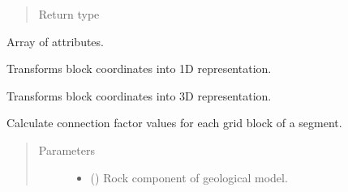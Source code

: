 \documentclass[letterpaper,10pt,english]{sphinxmanual}
\begin{document}
\begin{fulllineitems}
\begin{fulllineitems}
\begin{quote}
\begin{description}
\item[{Return type}] \leavevmode
{\hyperref[\detokenize{api/wells:geology.src.wells.Wells}]{}}

\end{description}\end{quote}

\end{fulllineitems}


\begin{fulllineitems}
\label{\detokenize{api/wells:geology.src.wells.Wells.attributes}}
Array of attributes.

\end{fulllineitems}


\begin{fulllineitems}
\label{\detokenize{api/wells:geology.src.wells.Wells.blocks_ravel}}
Transforms block coordinates into 1D representation.

\end{fulllineitems}


\begin{fulllineitems}
\label{\detokenize{api/wells:geology.src.wells.Wells.blocks_to_spatial}}
Transforms block coordinates into 3D representation.

\end{fulllineitems}


\begin{fulllineitems}
\label{\detokenize{api/wells:geology.src.wells.Wells.calculate_cf}}
Calculate connection factor values for each grid block of a segment.
\begin{quote}\begin{description}
\item[{Parameters}] \leavevmode\begin{itemize}
\item {} 
 () \textendash{} Rock component of geological model.


\end{itemize}
\end{description}
\end{quote}
\end{fulllineitems}
\end{fulllineitems}
\end{document}
